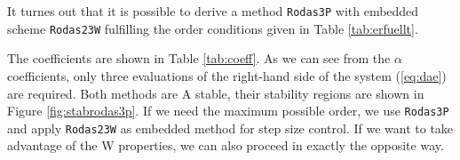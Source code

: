 \documentclass{juliacon}
\begin{document}
It turnes out that it is possible to derive a method \verb|Rodas3P| with embedded scheme \verb|Rodas23W| fulfilling the order conditions given in
Table \ref{tab:erfuellt}.

\begin{table} \label{tab:erfuellt}
\end{table}

The coefficients are shown in Table \ref{tab:coeff}.
As we can see from the $\alpha$ coefficients, only three evaluations of the right-hand side of the system (\ref{eq:dae}) are required.
Both methods are A stable, their stability regions are shown in Figure \ref{fig:stabrodas3p}.
If we need the maximum possible order, we use \verb|Rodas3P| and apply \verb|Rodas23W| as embedded method for step size control. 
If we want to take advantage of the W properties, we can also proceed in exactly the opposite way.
\end{document}
